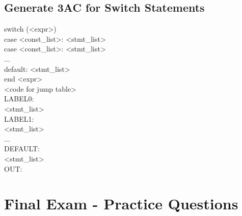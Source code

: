 \documentclass{report}
\newlength\tindent
\renewcommand{\indent}{\hspace*{\tindent}}
\begin{document}
\section{Generate 3AC for Switch Statements}
\vspace{-1em}
\begin{multicols}{2}
switch (<expr>) \\
\indent case <const\_list>: <stmt\_list> \\
\indent case <const\_list>: <stmt\_list> \\
\indent ... \\
\indent default: <stmt\_list> \\
end
  \vfill\columnbreak
\indent <expr> \\
\indent <code for jump table> \\
LABEL0: \\
\indent <stmt\_list> \\
LABEL1: \\
\indent <stmt\_list> \\
\indent ... \\
DEFAULT: \\
\indent <stmt\_list> \\
OUT:
\end{multicols}


\renewcommand\thechapter{E2}
\chapter{Final Exam - Practice Questions}
\end{document}
